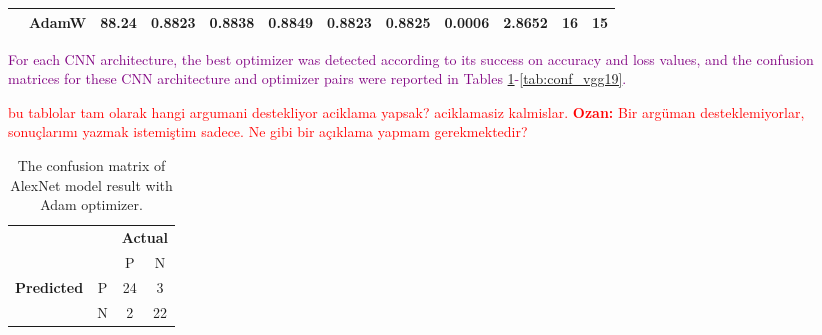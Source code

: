 \begin{landscape}
\begin{table}[!h]
\begin{tabular}{c|l|cccccc|cc|c|c}
                                    & AdamW                                                     & 88.24                  & 0.8823               & 0.8838               & 0.8849             & 0.8823    & 0.8825        & 0.0006                   & 2.8652             & 16                                                                                    & 15                                                                                     \\ \hline
\end{tabular}
\end{table}
\end{landscape}


\textcolor{purple}{For each CNN architecture, the best optimizer was detected according to its success on accuracy and loss values, and the confusion matrices for these CNN architecture and optimizer pairs were reported in Tables \ref{tab:conf_alexnet}-\ref{tab:conf_vgg19}.}
 
 \textcolor{red}{bu tablolar tam olarak hangi argumani destekliyor aciklama yapsak? aciklamasiz kalmislar. \textbf{Ozan:} Bir argüman desteklemiyorlar, sonuçlarımı yazmak istemiştim sadece. Ne gibi bir açıklama yapmam gerekmektedir?}
 
\begin{table}[!h]
\centering
\caption{The confusion matrix of AlexNet model result with Adam optimizer.}
\label{tab:conf_alexnet}
\begin{tabular}{|cc|c|c|}
\cline{1-4}
                                                 &   & \multicolumn{2}{c|}{\textbf{Actual}} \\ \cline{3-4} 
                                                 &   & P            & N            \\ \hline
\multicolumn{1}{|c|}{\multirow{2}{*}{\textbf{Predicted}}} & P & 24           & 3            \\ \cline{2-4} 
\multicolumn{1}{|c|}{}                           & N & 2            & 22           \\ \hline
\end{tabular}
\end{table}

